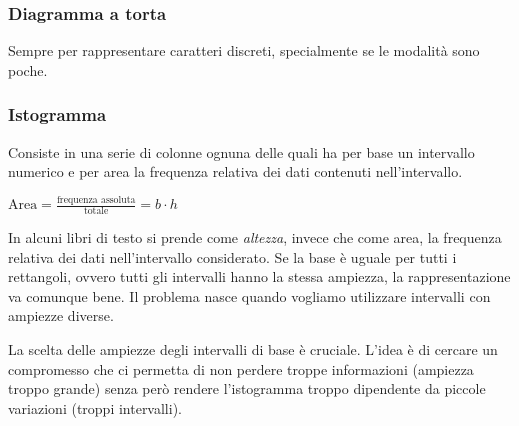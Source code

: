\subsubsection{Diagramma a torta}
Sempre per rappresentare caratteri discreti, specialmente se le modalità sono poche.
\begin{center}
\end{center}

\subsubsection{Istogramma}
Consiste in una serie di colonne ognuna delle quali ha per base un intervallo numerico e per area la frequenza relativa dei dati contenuti nell'intervallo.

\begin{center}
	$\text{Area}=\frac{\text{frequenza assoluta}}{\text{totale}} = b \cdot h$
\end{center}

\begin{observation}
	In alcuni libri di testo si prende come \textit{altezza}, invece che come area, la frequenza relativa dei dati nell'intervallo considerato. Se la base è uguale per tutti i rettangoli, ovvero tutti gli intervalli hanno la stessa ampiezza, la rappresentazione va comunque bene. Il problema nasce quando vogliamo utilizzare intervalli con ampiezze diverse.
\end{observation}

\begin{observation}
	La scelta delle ampiezze degli intervalli di base è cruciale. L'idea è di cercare un compromesso che ci permetta di non perdere troppe informazioni (ampiezza troppo grande) senza però rendere l'istogramma troppo dipendente da piccole variazioni (troppi intervalli).
\end{observation}

